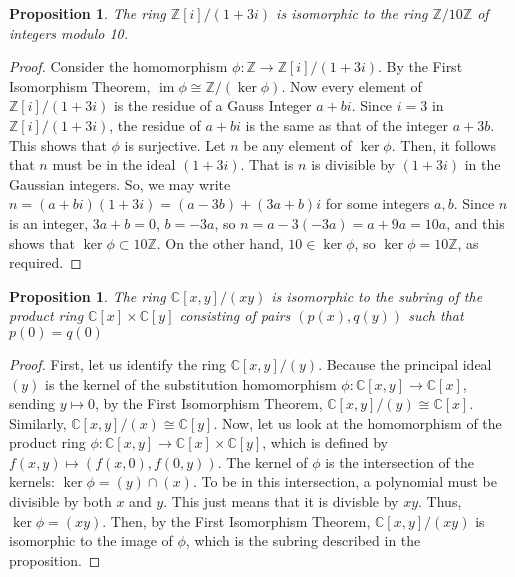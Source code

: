 \documentclass[12pt]{article}
\newtheorem{prop}[thm]{Proposition}
\theoremstyle{definition}
\theoremstyle{remark}
\numberwithin{equation}{section}
\newcommand\C{\mathbb C}    %
\newcommand\Z{\mathbb Z}    %
\DeclareMathOperator{\im}{im}
\begin{document}
\vspace{15pt}

\begin{prop}
        The ring $\Z[i]/(1+3i)$ is isomorphic to the ring $\Z/10\Z$ of integers modulo 10.
\end{prop}
\begin{proof}
        Consider the homomorphism $\phi:\Z\rightarrow\Z[i]/(1+3i)$. By the First Isomorphism Theorem, $\im \phi \cong \Z/(\ker\phi)$. Now every element of $\Z[i]/(1+3i)$ is the residue of a Gauss Integer $a+bi$. Since $i = 3$ in $\Z[i]/(1+3i)$, the residue of $a+bi$ is the same as that of the integer $a+3b$. This shows that $\phi$ is surjective. Let $n$ be any element of $\ker \phi$. Then, it follows that $n$ must be in the ideal $(1+3i)$. That is $n$ is divisible by $(1+3i)$ in the Gaussian integers. So, we may write $n = (a+bi)(1+3i) = (a-3b)+(3a+b)i$ for some integers $a,b$. Since $n$ is an integer, $3a+b = 0$, $b = -3a$, so $n = a-3(-3a) = a+9a = 10a$, and this shows that $\ker \phi \subset 10\Z$. On the other hand, $10 \in \ker \phi$, so $\ker \phi = 10\Z$, as required.
\end{proof}

\vspace{15pt}

\begin{prop}
        The ring $\C[x,y]/(xy)$ is isomorphic to the subring of the product ring $\C[x]\times \C[y]$ consisting of pairs $(p(x),q(y))$ such that $p(0) = q(0)$
\end{prop}
\begin{proof}
        First, let us identify the ring $\C[x,y]/(y)$. Because the principal ideal $(y)$ is the kernel of the substitution homomorphism $\phi:\C[x,y]\rightarrow\C[x]$, sending $y\mapsto 0$, by the First Isomorphism Theorem, $\C[x,y]/(y) \cong \C[x]$. Similarly, $\C[x,y]/(x)\cong \C[y]$. Now, let us look at the homomorphism of the product ring $\phi:\C[x,y]\rightarrow \C[x]\times \C[y]$, which is defined by $f(x,y) \mapsto (f(x,0),f(0,y))$. The kernel of $\phi$ is the intersection of the kernels: $\ker \phi = (y)\cap (x)$. To be in this intersection, a polynomial must be divisible by both $x$ and $y$. This just means that it is divisble by $xy$. Thus, $\ker \phi = (xy)$. Then, by the First Isomorphism Theorem, $\C[x,y]/(xy)$ is isomorphic to the image of $\phi$, which is the subring described in the proposition.
\end{proof}
\vspace{15pt}
\end{document}
